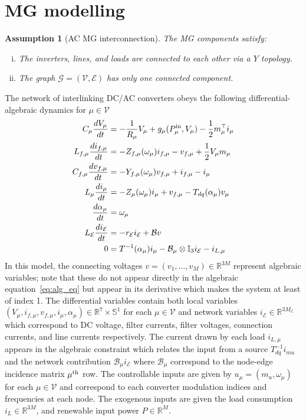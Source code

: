 \documentclass[journal, final, letterpaper]{IEEEtran}
\newtheorem{assumption}{Assumption}
\newcommand{\ts}[1]{{\textnormal{#1}}}
\newcommand{\diff}[2]{{\frac{d #1}{d #2}}}
\newcommand{\Rset}{\mathbb{R}}
\newcommand{\mc}{\mathcal}
\newcommand{\mbb}{\mathbb}
\begin{document}

%
%
\section{\ac{MG} modelling}
\label{sec:mg_modelling}

\begin{assumption}[AC \ac{MG} interconnection] The \ac{MG} components satisfy:
\begin{enumerate}[i)]
	\item The inverters, lines, and loads are connected to each other via a $Y$ topology.
	\item The graph $\mc{G} = (\mc{V},\mc{E})$ has only one connected component. 
\end{enumerate}
\label{asssump:MG_connected}
\end{assumption}
%
The network of interlinking DC/AC converters obeys the following differential-algebraic dynamics for $\mu\in\mc{V}$
%
\begin{subequations}
  \begin{align}
    C_\mu \diff{V_\mu}{t} & = -\frac{1}{R_\mu}V_\mu + g_\mu(P_\mu^\ts{in},V_\mu) - \frac{1}{2}m_\mu^\top i_\mu\\
    L_{f,\mu} \diff{i_{f,\mu}}{t} &= -Z_{f,\mu}(\omega_\mu) i_{f,\mu} - v_{f,\mu} + \frac{1}{2}V_\mu m_\mu\\
    C_{f,\mu} \diff{v_{f,\mu}}{t} &= -Y_{f,\mu}(\omega_\mu) v_{f,\mu} + i_{f,\mu} - i_{\mu}\\
    L_\mu \diff{i_{\mu}}{t} &= -Z_\mu(\omega_\mu) i_{\mu} + v_{f,\mu} -T_{dq}(\alpha_\mu)v_{\mu}\\
    \diff{\alpha_\mu}{t}  &= \omega_\mu\\
    L_\mc{E}\diff{i_\mc{E}}{t} & = -r_\mc{E}i_\mc{E} + \mc{B}v\\
    0  &= T^{-1}(\alpha_\mu)i_\mu - \mc{B}_\mu\otimes\mbb{I}_3 i_\mc{E} - i_{L,\mu}\label{eq:alg_eq}
\end{align}
\label{eq:mg_AC_model}
\end{subequations}
%
In this model, the connecting voltages $v = (v_1,\ldots,v_M)\in\Rset^{3M}$ represent algebraic variables; note that these do not appear directly in the algebraic equation~\eqref{eq:alg_eq} but appear in its derivative which makes the system at least of index 1. The differential variables contain both local variables $(V_\mu,i_{f,\mu},v_{f,\mu},i_\mu,\alpha_\mu)\in\Rset^{7}\times\mbb{S}^{1}$ for each $\mu\in\mc{V}$ and network variables $i_\mc{E}\in\Rset^{3M_\mc{E}}$ which correspond to DC voltage, filter currents, filter voltages, connection currents, and line currents respectively. The current drawn by each load $i_{L,\mu}$ appears in the algebraic constraint which relates the input from a source $T_{dq}^{-1}i_{mu}$ and the network contribution $\mc{B}_{\mu}i_\mc{E}$ where $\mc{B}_\mu$ correspond to the node-edge incidence matrix  $\mu^\ts{th}$ row. The controllable inputs are given by $u_\mu = (m_u,\omega_\mu)$ for each $\mu\in\mc{V}$ and correspond to each converter modulation indices and frequencies at each node. The exogenous inputs are given the load consumption $i_L\in\Rset^{3M}$, and renewable input power $P \in \Rset^{M}$.
\end{document}
